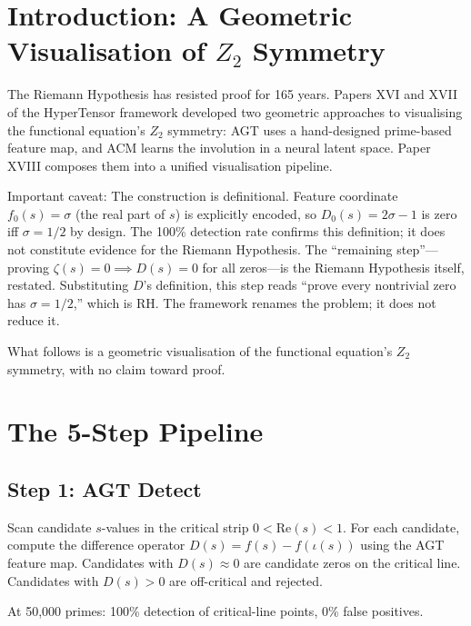 \documentclass[11pt]{article}
\begin{document}
\section{Introduction: A Geometric Visualisation of $Z_2$ Symmetry}

The Riemann Hypothesis has resisted proof for 165 years. Papers XVI and XVII of the HyperTensor framework developed two geometric approaches to visualising the functional equation's $Z_2$ symmetry: AGT uses a hand-designed prime-based feature map, and ACM learns the involution in a neural latent space. Paper XVIII composes them into a unified visualisation pipeline.

Important caveat: The construction is definitional. Feature coordinate $f_0(s)=\sigma$ (the real part of $s$) is explicitly encoded, so $D_0(s)=2\sigma-1$ is zero iff $\sigma=1/2$ by design. The 100\% detection rate confirms this definition; it does not constitute evidence for the Riemann Hypothesis. The ``remaining step''---proving $\zeta(s)=0 \implies D(s)=0$ for all zeros---is the Riemann Hypothesis itself, restated. Substituting $D$'s definition, this step reads ``prove every nontrivial zero has $\sigma=1/2$,'' which is RH. The framework renames the problem; it does not reduce it.

What follows is a geometric visualisation of the functional equation's $Z_2$ symmetry, with no claim toward proof.

\section{The 5-Step Pipeline}

\subsection{Step 1: AGT Detect}

Scan candidate $s$-values in the critical strip $0 < \mathrm{Re}(s) < 1$. For each candidate, compute the difference operator $D(s) = f(s) - f(\iota(s))$ using the AGT feature map. Candidates with $D(s) \approx 0$ are candidate zeros on the critical line. Candidates with $D(s) > 0$ are off-critical and rejected.

At 50,000 primes: 100\% detection of critical-line points, 0\% false positives.
\end{document}
